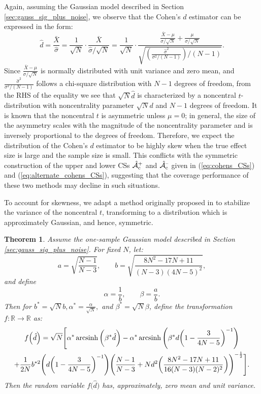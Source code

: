 Again, assuming the Gaussian model described in Section \ref{sec:gauss_sig_plus_noise}, we observe that the Cohen's $d$ estimator can be expressed in the form: 
\begin{equation}
\label{eq:cohens_d_estimator}
\hat{d} = \frac{\bar{X}}{\hat{\sigma}} =  \frac{1}{\sqrt{N}} \cdot \frac{\bar{X}}{\hat{\sigma}/\sqrt{N}} = \frac{1}{\sqrt{N}} \cdot \frac{\frac{\bar{X} - \mu}{\sigma / \sqrt{N}} + \frac{\mu}{\sigma / \sqrt{N}}}{\sqrt{\left(\frac{\hat{\sigma}^{2}}{\sigma^{2}/(N-1)}\right)/(N-1)}}.
\end{equation}
Since $\frac{\bar{X} - \mu}{\sigma / \sqrt{N}}$ is normally distributed with unit variance and zero mean, and $\frac{\hat{\sigma}^{2}}{\sigma^{2}/(N-1)}$ follows a chi-square distribution with $N-1$ degrees of freedom, from the RHS of the equality we see that $\sqrt{N}\hat{d}$ is characterized by a noncentral $t$-distribution with noncentrality parameter $\sqrt{N}d$ and $N - 1$ degrees of freedom. It is known that the noncentral $t$ is asymmetric unless $\mu = 0$; in general, the size of the asymmetry scales with the magnitude of the noncentrality parameter and is inversely proportional to the degrees of freedom. Therefore, we expect the distribution of the Cohen's $d$ estimator to be highly skew when the true effect size is large and the sample size is small. This conflicts with the symmetric construction of the upper and lower CSs $\operatorname{\hat{\mathcal{A}}_{c}^+}$ and $\operatorname{\hat{\mathcal{A}}_{c}^{\textrm{--}}}$ given in (\ref{eq:cohens_CSs}) and (\ref{eq:alternate_cohens_CSs}), suggesting that the coverage performance of these two methods may decline in such situations. 

To account for skewness, we adapt a method originally proposed in \textit{\citet*{Laubscher1960-px}} to stabilize the variance of the noncentral $t$, transforming to a distribution which is approximately Gaussian, and hence, symmetric.
\newtheorem{cohen_theorem}{Theorem}
\begin{cohen_theorem} 
\label{thm:Theorem_1}
Assume the one-sample Gaussian model described in Section \ref{sec:gauss_sig_plus_noise}. For fixed $N$, let: $$a = \sqrt{\frac{N-1}{N-3}}, \qquad b = \sqrt{\frac{8N^{2}-17N + 11}{(N-3)(4N-5)^{2}}},$$
and define $$\alpha = \frac{1}{b}, \qquad \beta = \frac{a}{b}.$$
Then for $b^{*}=\sqrt{N}b, \alpha^{*}=\frac{\alpha}{\sqrt{N}},$ and $\beta^{*}=\sqrt{N}\beta$, define the transformation $f : \mathbb{R} \rightarrow \mathbb{R}$ as:
\begin{multline}
    f\Big(\hat{d}\Big) = \sqrt{N} \Bigg[\alpha^{*} \operatorname{arcsinh}\bigg({\beta^{*} \hat{d}}\bigg) - \alpha^{*} \operatorname{arcsinh}\Bigg({\beta^{*} d} \bigg(1 - \frac{3}{4N - 5}\bigg)^{-1} \Bigg) \\
                + \frac{1}{2N}b^{*2}\Bigg(d \bigg(1 - \frac{3}{4N - 5}\bigg)^{-1} \Bigg)\Bigg(\frac{N-1}{N-3} + N d^{2} \bigg(\frac{8N^{2} - 17N + 11}{16(N-3)(N-2)^{2}} \bigg)\Bigg)^{-\frac{1}{2}} \Bigg].
\end{multline}
Then the random variable $f\Big(\hat{d}\Big)$ has, approximately, zero mean and unit variance.  
\end{cohen_theorem}

